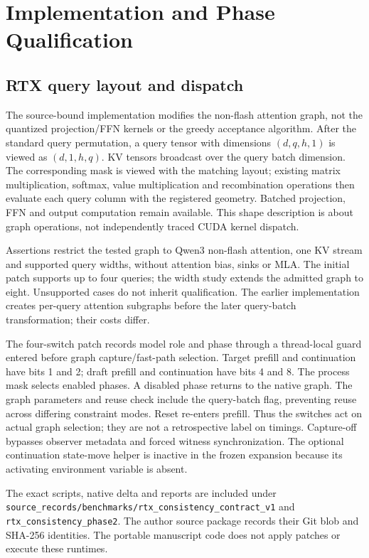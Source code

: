 \section{Implementation and Phase Qualification}
\label{supp:implementation}
\subsection{RTX query layout and dispatch}
\label{supp:query_layout}
The source-bound implementation modifies the non-flash attention graph, not the quantized projection/FFN kernels or the greedy acceptance algorithm. After the standard query permutation, a query tensor with dimensions $(d,q,h,1)$ is viewed as $(d,1,h,q)$. KV tensors broadcast over the query batch dimension. The corresponding mask is viewed with the matching layout; existing matrix multiplication, softmax, value multiplication and recombination operations then evaluate each query column with the registered geometry. Batched projection, FFN and output computation remain available. This shape description is about graph operations, not independently traced CUDA kernel dispatch.

Assertions restrict the tested graph to Qwen3 non-flash attention, one KV stream and supported query widths, without attention bias, sinks or MLA. The initial patch supports up to four queries; the width study extends the admitted graph to eight. Unsupported cases do not inherit qualification. The earlier implementation creates per-query attention subgraphs before the later query-batch transformation; their costs differ.

The four-switch patch records model role and phase through a thread-local guard entered before graph capture/fast-path selection. Target prefill and continuation have bits 1 and 2; draft prefill and continuation have bits 4 and 8. The process mask selects enabled phases. A disabled phase returns to the native graph. The graph parameters and reuse check include the query-batch flag, preventing reuse across differing constraint modes. Reset re-enters prefill. Thus the switches act on actual graph selection; they are not a retrospective label on timings. Capture-off bypasses observer metadata and forced witness synchronization. The optional continuation state-move helper is inactive in the frozen expansion because its activating environment variable is absent.

The exact scripts, native delta and reports are included under \nolinkurl{source_records/benchmarks/rtx_consistency_contract_v1} and \nolinkurl{rtx_consistency_phase2}. The author source package records their Git blob and SHA-256 identities. The portable manuscript code does not apply patches or execute these runtimes.

